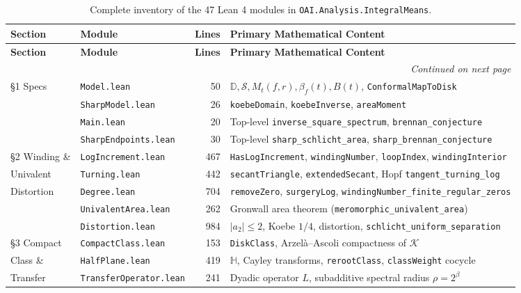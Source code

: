 \documentclass[11pt,reqno]{amsart}
\theoremstyle{definition}
\newcommand{\D}{\mathbb{D}}
\newcommand{\uhp}{\mathbb{H}}
\newcommand{\Kclass}{\mathcal{K}}
\newcommand{\Sclass}{\mathcal{S}}
\begin{document}
\begin{longtable}{@{}llrl@{}}
\caption{Complete inventory of the 47 Lean 4 modules in \texttt{OAI.Analysis.IntegralMeans}.}\label{tab:modules}\\
\toprule
\textbf{Section} & \textbf{Module} & \textbf{Lines} & \textbf{Primary Mathematical Content} \\
\midrule
\endfirsthead
\toprule
\textbf{Section} & \textbf{Module} & \textbf{Lines} & \textbf{Primary Mathematical Content} \\
\midrule
\endhead
\midrule
\multicolumn{4}{r}{\footnotesize\itshape Continued on next page} \\
\bottomrule
\endfoot
\bottomrule
\endlastfoot
\S1 Specs & \texttt{Model.lean} & 50 & $\D, \Sclass, M_t(f,r), \beta_f(t), B(t)$, \texttt{ConformalMapToDisk} \\
 & \texttt{SharpModel.lean} & 26 & \texttt{koebeDomain}, \texttt{koebeInverse}, \texttt{areaMoment} \\
 & \texttt{Main.lean} & 20 & Top-level \texttt{inverse\_square\_spectrum}, \texttt{brennan\_conjecture} \\
 & \texttt{SharpEndpoints.lean} & 30 & Top-level \texttt{sharp\_schlicht\_area}, \texttt{sharp\_brennan\_conjecture} \\
\midrule
\S2 Winding \& & \texttt{LogIncrement.lean} & 467 & \texttt{HasLogIncrement}, \texttt{windingNumber}, \texttt{loopIndex}, \texttt{windingInterior} \\
\quad Univalent & \texttt{Turning.lean} & 442 & \texttt{secantTriangle}, \texttt{extendedSecant}, Hopf \texttt{tangent\_turning\_log} \\
\quad Distortion & \texttt{Degree.lean} & 704 & \texttt{removeZero}, \texttt{surgeryLog}, \texttt{windingNumber\_finite\_regular\_zeros} \\
 & \texttt{UnivalentArea.lean} & 262 & Gronwall area theorem (\texttt{meromorphic\_univalent\_area}) \\
 & \texttt{Distortion.lean} & 984 & $|a_2|\le 2$, Koebe $1/4$, distortion, \texttt{schlicht\_uniform\_separation} \\
\midrule
\S3 Compact & \texttt{CompactClass.lean} & 153 & \texttt{DiskClass}, Arzel\`a--Ascoli compactness of $\Kclass$ \\
\quad Class \& & \texttt{HalfPlane.lean} & 419 & $\uhp$, Cayley transforms, \texttt{rerootClass}, \texttt{classWeight} cocycle \\
\quad Transfer & \texttt{TransferOperator.lean} & 241 & Dyadic operator $L$, subadditive spectral radius $\rho = 2^\beta$ \\

\end{longtable}
\end{document}
